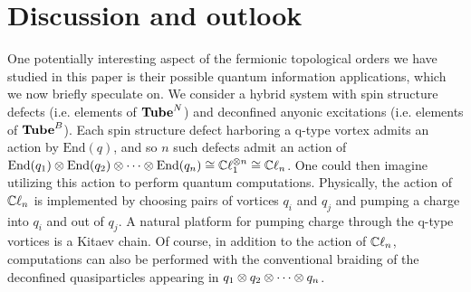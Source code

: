 
\section{Discussion and outlook} \label{discussion}

One potentially interesting aspect of the fermionic topological orders we have studied in this paper is their possible quantum information 
applications, which we now briefly speculate on. 
We consider a hybrid system with spin structure defects (i.e. elements of $\textbf{Tube}^N$) and deconfined anyonic excitations (i.e. elements of $\textbf{Tube}^B$).
Each spin structure defect harboring a q-type vortex admits an action by $\text{End}(q)$, 
and so $n$ such defects admit an action of $\text{End}(q_1) \otimes \text{End}(q_2) \otimes \cdots \otimes \text{End}(q_n) \cong \mathbb{C}\ell_1^{\otimes n} \cong \mathbb{C}\ell_n$.
One could then imagine utilizing this action to perform quantum computations. 
Physically, the action of $\mathbb{C}\ell_n$ is implemented by choosing pairs of vortices $q_i$ and $q_j$ and pumping a charge into $q_i$ and out of $q_j$.
A natural platform for pumping charge through the q-type vortices is a Kitaev chain.
Of course, in addition to the action of $\mathbb{C}\ell_n$, computations can also be performed with the conventional braiding of the deconfined quasiparticles appearing in $q_1 \otimes q_2 \otimes \cdots \otimes q_n$.


